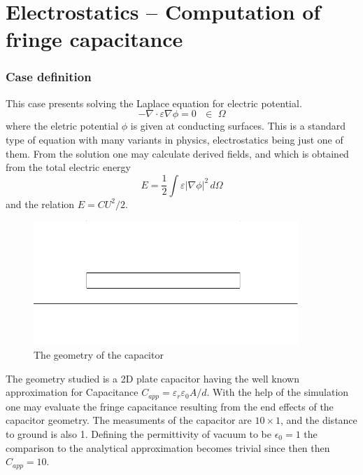 \chapter{Electrostatics -- Computation of fringe capacitance}


\subsection*{Case definition}

This case presents solving the Laplace equation for electric potential.
\begin{equation}
  - \nabla \cdot \varepsilon \nabla \phi = 0  \, \, \, \, \in \, \, \Omega
\end{equation}
where the eletric potential $\phi$ is given at conducting surfaces.
This is a standard type of equation with many variants in physics, electrostatics being just one of them.
From the solution one may calculate 
derived fields, and 
which is obtained from the total electric energy 
\begin{equation}
  E=\frac{1}{2} \int \varepsilon | \nabla \phi |^2 \, d\Omega
\end{equation}
and the relation $E=CU^2/2$.

\begin{figure}[h]
\centering
\includegraphics[width=10cm, viewport=0 20 640 280,clip]{capacitor}
\caption{The geometry of the capacitor}\label{fg:es_capacitor}
\end{figure} 

The geometry studied 
is a 2D plate capacitor having the well known approximation
for Capacitance $C_{app}=\varepsilon_r\varepsilon_0 A/d$.
With the help of the
simulation one may evaluate the fringe capacitance resulting
from the end effects of the capacitor geometry.
The measuments of the capacitor are $10 \times 1$, and the distance to
ground is also 1. Defining the permittivity of vacuum to be 
$\epsilon_0 = 1$ the comparison to the analytical approximation
becomes trivial since then then $C_{app} = 10$. 

